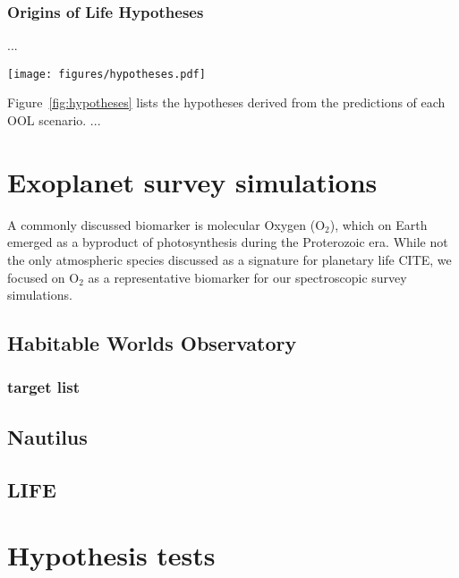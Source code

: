 \documentclass[twocolumn]{aastex631}
\begin{document}
\subsubsection{Origins of Life Hypotheses}
...
\begin{figure*}
    \begin{centering}
        \texttt{[image: figures/hypotheses.pdf]}
        \caption{Origins of Life scenarios, their predictions on exoplanet observables, and derived population-level hypotheses.}
        \label{fig:hypotheses}
    \end{centering}
\end{figure*}
Figure~\ref{fig:hypotheses} lists the hypotheses derived from the predictions of each OOL scenario.
...


\section{Exoplanet survey simulations}
A commonly discussed biomarker is molecular Oxygen (O$_2$), which on Earth emerged as a byproduct of photosynthesis during the Proterozoic era.
While not the only atmospheric species discussed as a signature for planetary life CITE, we focused on O$_2$ as a representative biomarker for our spectroscopic survey simulations.


\subsection{Habitable Worlds Observatory}
\subsubsection{target list}


\subsection{Nautilus}
\subsection{LIFE} %

\section{Hypothesis tests}
\label{sec:hypotests}
\end{document}
